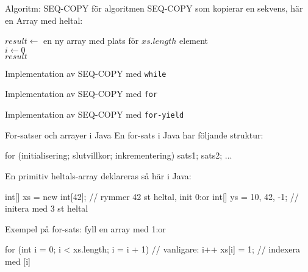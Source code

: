 \begin{Slide}{Algoritm: SEQ-COPY}
 för algoritmen SEQ-COPY som kopierar en sekvens, här en Array med heltal:\\
\noindent\hrulefill
\begin{algorithm}[H]
 $result \leftarrow$ en ny array med plats för $xs.length$ element\\
 $i \leftarrow 0$  \\
 \Return $result$
\end{algorithm}
\noindent\hrulefill
\end{Slide}

\begin{Slide}{Implementation av SEQ-COPY med \texttt{while}}

\end{Slide}

\begin{Slide}{Implementation av SEQ-COPY med \texttt{for}}

\end{Slide}

\begin{Slide}{Implementation av SEQ-COPY med \texttt{for-yield}}

\end{Slide}


\begin{Slide}{For-satser och arrayer i Java}
En for-sats i Java har följande struktur:
\begin{Code}[language=Java, basicstyle=\fontsize{10}{12}\ttfamily\selectfont]
for (initialisering; slutvillkor; inkrementering) {
    sats1;
    sats2;
    ...
}
\end{Code}
En primitiv heltals-array deklareras så här i Java:
\begin{Code}[language=Java, basicstyle=\fontsize{9}{11}\ttfamily\selectfont]
int[] xs = new int[42];  // rymmer 42 st heltal, init 0:or
int[] ys = {10, 42, -1}; // initera med 3 st heltal  
\end{Code}
Exempel på for-sats: fyll en array med 1:or 
\begin{Code}[language=Java, basicstyle=\fontsize{9}{11}\ttfamily\selectfont]
for (int i = 0; i < xs.length; i = i + 1){ // vanligare: i++
  xs[i] = 1;                             // indexera med [i]
}
\end{Code}

\end{Slide}

